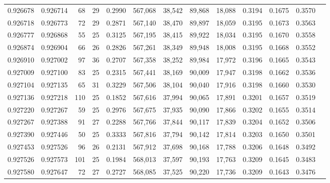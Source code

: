 \begin{tabular}{rrrrrrrrrrrrr}
0.926678 & 0.926714 &    68 &  29 &                                     0.2990 & 567,068 &  38,542 &  89,868 &  18,088 & 0.3194 & 0.1675 & 0.3570 \\
0.926718 & 0.926773 &    72 &  29 &                                     0.2871 & 567,140 &  38,470 &  89,897 &  18,059 & 0.3195 & 0.1673 & 0.3563 \\
0.926777 & 0.926868 &    55 &  25 &                                     0.3125 & 567,195 &  38,415 &  89,922 &  18,034 & 0.3195 & 0.1670 & 0.3558 \\
0.926874 & 0.926904 &    66 &  26 &                                     0.2826 & 567,261 &  38,349 &  89,948 &  18,008 & 0.3195 & 0.1668 & 0.3552 \\
0.926910 & 0.927002 &    97 &  36 &                                     0.2707 & 567,358 &  38,252 &  89,984 &  17,972 & 0.3196 & 0.1665 & 0.3543 \\
0.927009 & 0.927100 &    83 &  25 &                                     0.2315 & 567,441 &  38,169 &  90,009 &  17,947 & 0.3198 & 0.1662 & 0.3536 \\
0.927104 & 0.927135 &    65 &  31 &                                     0.3229 & 567,506 &  38,104 &  90,040 &  17,916 & 0.3198 & 0.1660 & 0.3530 \\
0.927136 & 0.927218 &   110 &  25 &                                     0.1852 & 567,616 &  37,994 &  90,065 &  17,891 & 0.3201 & 0.1657 & 0.3519 \\
0.927220 & 0.927267 &    59 &  25 &                                     0.2976 & 567,675 &  37,935 &  90,090 &  17,866 & 0.3202 & 0.1655 & 0.3514 \\
0.927267 & 0.927388 &    91 &  27 &                                     0.2288 & 567,766 &  37,844 &  90,117 &  17,839 & 0.3204 & 0.1652 & 0.3506 \\
0.927390 & 0.927446 &    50 &  25 &                                     0.3333 & 567,816 &  37,794 &  90,142 &  17,814 & 0.3203 & 0.1650 & 0.3501 \\
0.927453 & 0.927526 &    96 &  26 &                                     0.2131 & 567,912 &  37,698 &  90,168 &  17,788 & 0.3206 & 0.1648 & 0.3492 \\
0.927526 & 0.927573 &   101 &  25 &                                     0.1984 & 568,013 &  37,597 &  90,193 &  17,763 & 0.3209 & 0.1645 & 0.3483 \\
0.927580 & 0.927647 &    72 &  27 &                                     0.2727 & 568,085 &  37,525 &  90,220 &  17,736 & 0.3209 & 0.1643 & 0.3476 \\

\end{tabular}
